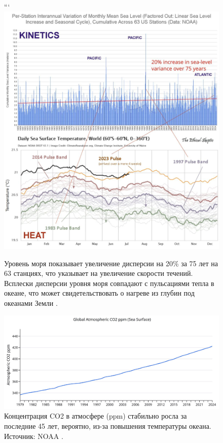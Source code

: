 \documentclass[10pt,twocolumn,letterpaper]{article}
\begin{document}
\begin{figure}[t]
\begin{center}
```
\includegraphics[width=1\textwidth]{sealevel.jpeg}
\end{center}
   \caption{Уровень моря показывает увеличение дисперсии на 20\% за 75 лет на 63 станциях, что указывает на увеличение скорости течений. Всплески дисперсии уровня моря совпадают с пульсациями тепла в океане, что может свидетельствовать о нагреве из глубин под океанами Земли \cite{2,129}.}
\label{fig:22}
\end{figure}

\begin{figure}[t]
\begin{center}
\includegraphics[width=1\textwidth]{co2.jpg}
\end{center}
   \caption{Концентрация CO2 в атмосфере (ppm) стабильно росла за последние 45 лет, вероятно, из-за повышения температуры океана. Источник: NOAA \cite{148,129}.}
\label{fig:23}
\end{figure}
\end{document}
